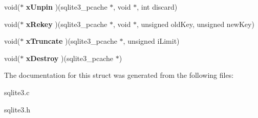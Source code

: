 \begin{DoxyCompactItemize}
\item 
\hypertarget{structsqlite3__pcache__methods_ade2ab50cc6896be03ee86541877fa85e}{void($\ast$ {\bfseries x\-Unpin} )(sqlite3\-\_\-pcache $\ast$, void $\ast$, int discard)}\label{structsqlite3__pcache__methods_ade2ab50cc6896be03ee86541877fa85e}

\item 
\hypertarget{structsqlite3__pcache__methods_adc5552190f1de86eb95d91e9cf8430e6}{void($\ast$ {\bfseries x\-Rekey} )(sqlite3\-\_\-pcache $\ast$, void $\ast$, unsigned old\-Key, unsigned new\-Key)}\label{structsqlite3__pcache__methods_adc5552190f1de86eb95d91e9cf8430e6}

\item 
\hypertarget{structsqlite3__pcache__methods_aad73f9335999770bcd2dc6a2d914b4f0}{void($\ast$ {\bfseries x\-Truncate} )(sqlite3\-\_\-pcache $\ast$, unsigned i\-Limit)}\label{structsqlite3__pcache__methods_aad73f9335999770bcd2dc6a2d914b4f0}

\item 
\hypertarget{structsqlite3__pcache__methods_aac18fc581d8d63550a6657016c24ba5d}{void($\ast$ {\bfseries x\-Destroy} )(sqlite3\-\_\-pcache $\ast$)}\label{structsqlite3__pcache__methods_aac18fc581d8d63550a6657016c24ba5d}

\end{DoxyCompactItemize}


The documentation for this struct was generated from the following files\-:\begin{DoxyCompactItemize}
\item 
sqlite3.\-c\item 
sqlite3.\-h\end{DoxyCompactItemize}
